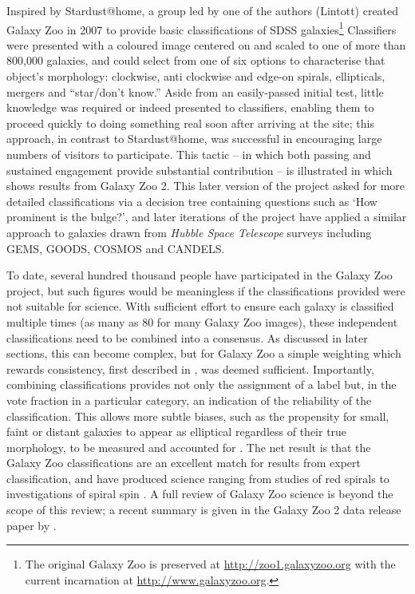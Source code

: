 \documentclass{ar2e}
\begin{document}
Inspired by Stardust@home, a group led by one of the authors (Lintott) created
Galaxy Zoo in 2007 to provide basic classifications of SDSS
galaxies\footnote{The original Galaxy Zoo is preserved at
\url{http://zoo1.galaxyzoo.org} with the current incarnation at
\url{http://www.galaxyzoo.org}.} Classifiers were presented with a coloured
image centered on and scaled to one of more than 800,000 galaxies, and could
select from one of six options to characterise that object's morphology: 
clockwise, anti clockwise and edge-on spirals,
ellipticals, mergers and ``star/don't know.'' Aside from  an easily-passed
initial test, little knowledge was required or indeed presented to classifiers,
enabling them to proceed quickly to doing something real soon after arriving at the
site; this approach, in contrast to Stardust@home, was
successful in encouraging large numbers of visitors to participate. 
This tactic -- in which both passing and sustained engagement provide
substantial contribution -- is illustrated in  which shows results from
Galaxy Zoo 2. This later version of the project asked for more detailed
classifications via a decision tree containing questions such as `How prominent
is the bulge?', and later iterations of the project have applied a similar
approach to galaxies drawn from \emph{Hubble Space Telescope} surveys including
\textsc{GEMS, GOODS, COSMOS} and \textsc{CANDELS}. 
% 

To date, several hundred thousand people 
have participated in the Galaxy Zoo project, but such
figures would be meaningless if the classifications provided were not suitable
for science. With sufficient effort to ensure each galaxy is classified multiple
times (as many as 80 for many Galaxy Zoo images), these independent
classifications need to be combined into a consensus. As discussed in later
sections, this can become complex, but for Galaxy Zoo a simple weighting which
rewards consistency, first described in \citet{Land++2008}, was deemed sufficient.
Importantly, combining classifications provides not only the assignment of a
label but, in the vote fraction in a particular category, an indication of the
reliability of the classification. This allows more subtle biases, such as the
propensity for small, faint or distant galaxies to appear as elliptical
regardless of their true morphology, to be measured and accounted for
\citep[see][]{Bamford++2009}. The net result is that the Galaxy Zoo classifications
are an excellent match for results from expert classification, and have produced
science ranging from studies of red spirals \citep{Masters++2010} to investigations
of spiral spin \citep{Slosar++2009}.
A full review of Galaxy Zoo science is beyond the scope of this review; a recent
summary is given in the Galaxy Zoo 2 data release paper by \citet{Willett++2013}.
\end{document}
